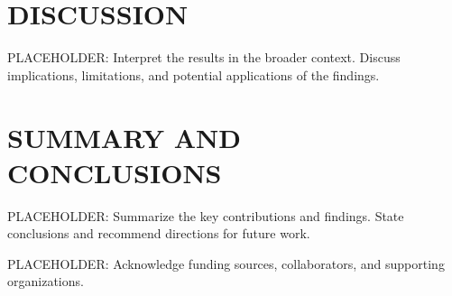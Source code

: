 \documentclass{nrlreport} %
\begin{document}


\chapter{DISCUSSION}
\label{chap:discussion}

PLACEHOLDER: Interpret the results in the broader context. Discuss implications,
limitations, and potential applications of the findings.


\chapter{SUMMARY AND CONCLUSIONS}
\label{chap:conclusions}

PLACEHOLDER: Summarize the key contributions and findings. State conclusions
and recommend directions for future work.



\begin{acknowledgments}
PLACEHOLDER: Acknowledge funding sources, collaborators, and supporting organizations.
\end{acknowledgments}


\end{document}
